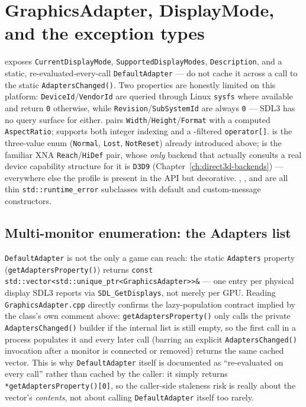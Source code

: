 \section{GraphicsAdapter, DisplayMode, and the exception types}
\label{sec:adapter-displaymode}

 exposes \texttt{CurrentDisplayMode}, \texttt{SupportedDisplayModes},
\texttt{Description}, and a static, re-evaluated-every-call \texttt{DefaultAdapter} --- do not
cache it across a call to the static \texttt{AdaptersChanged()}. Two properties are honestly
limited on this platform: \texttt{DeviceId}/\texttt{VendorId} are queried through Linux
\texttt{sysfs} where available and return \texttt{0} otherwise, while
\texttt{Revision}/\texttt{SubSystemId} are always \texttt{0} --- SDL3 has no query surface for
either.  pairs \texttt{Width}/\texttt{Height}/\texttt{Format} with a
computed \texttt{AspectRatio};  supports both integer indexing
and a -filtered \texttt{operator[]}.  is
the three-value enum (\texttt{Normal}, \texttt{Lost}, \texttt{NotReset}) already introduced
above;  is the familiar XNA \texttt{Reach}/\texttt{HiDef} pair, whose
\emph{only} backend that actually consults a real device capability structure for it is
\texttt{D3D9} (Chapter~\ref{ch:direct3d-backends}) --- everywhere else the profile is present in
the API but decorative. , , and
 are all thin \texttt{std::runtime\_error}
subclasses with default and custom-message constructors.

\subsection{Multi-monitor enumeration: the Adapters list}
\label{sec:adapters-list}

\texttt{DefaultAdapter} is not the only  a game can reach: the static
\texttt{Adapters} property (\texttt{getAdaptersProperty()}) returns
\texttt{const std::vector<std::unique\_ptr<GraphicsAdapter>>\&} --- one entry per physical
display SDL3 reports via \texttt{SDL\_GetDisplays}, not merely per GPU. Reading
\texttt{GraphicsAdapter.cpp} directly confirms the lazy-population contract implied by the
class's own comment above: \texttt{getAdaptersProperty()} only calls the private
\texttt{AdaptersChanged()} builder if the internal list is still empty, so the first call in a
process populates it and every later call (barring an explicit \texttt{AdaptersChanged()}
invocation after a monitor is connected or removed) returns the same cached vector. This is
why \texttt{DefaultAdapter} itself is documented as ``re-evaluated on every call'' rather than
cached by the caller: it simply returns \texttt{*getAdaptersProperty()[0]}, so the caller-side
staleness risk is really about the vector's \emph{contents}, not about calling
\texttt{DefaultAdapter} itself too rarely.

